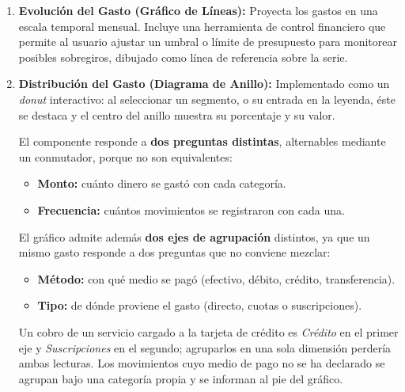 \begin{enumerate}
    \item \textbf{Evolución del Gasto (Gráfico de Líneas):}
    Proyecta los gastos en una escala temporal mensual. Incluye una herramienta de control financiero que permite al usuario ajustar un umbral o límite de presupuesto para monitorear posibles sobregiros, dibujado como línea de referencia sobre la serie.

    \item \textbf{Distribución del Gasto (Diagrama de Anillo):}
    Implementado como un \textit{donut} interactivo: al seleccionar un segmento, o su entrada en la leyenda, éste se destaca y el centro del anillo muestra su porcentaje y su valor.

    El componente responde a \textbf{dos preguntas distintas}, alternables mediante un conmutador, porque no son equivalentes:
    \begin{itemize}
        \item \textbf{Monto:} cuánto dinero se gastó con cada categoría.
        \item \textbf{Frecuencia:} cuántos movimientos se registraron con cada una.
    \end{itemize}

El gráfico admite además \textbf{dos ejes de agrupación} distintos, ya que un mismo gasto responde a dos preguntas que no conviene mezclar:
    \begin{itemize}
        \item \textbf{Método:} con qué medio se pagó (efectivo, débito, crédito, transferencia).
        \item \textbf{Tipo:} de dónde proviene el gasto (directo, cuotas o suscripciones).
    \end{itemize}

    Un cobro de un servicio cargado a la tarjeta de crédito es \textit{Crédito} en el primer eje y \textit{Suscripciones} en el segundo; agruparlos en una sola dimensión perdería ambas lecturas. Los movimientos cuyo medio de pago no se ha declarado se agrupan bajo una categoría propia y se informan al pie del gráfico.
\end{enumerate}

